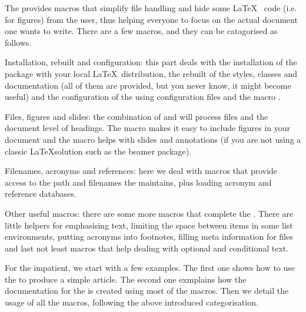 
The  provides macros that simplify file handling and hide some \LaTeX~
code (i.e. for figures) from the user, thus helping everyone to focus on
the actual document one wants to write. There are a few macros, and they
can be catagorised as follows.
\begin{skbnotelist}
  \item Installation, rebuilt and configuration: this part deals with the 
        installation of the package with your local \LaTeX~distribution,
        the rebuilt of the styles, classes and documentation (all of them are
        provided, but you never know, it might become useful) and the configuration
        of the  using configuration files and the macro \cmd{\skbconfig}.
  \item Files, figures and slides: the combination of \cmd{\skbheading} and
        \cmd{\skbinput} will process files and the document level of headings.
        The macro \cmd{\skbfigure} makes it easy to include figures in your document 
        and the macro \cmd{\skbslide} helps with  slides and annotations (if 
        you are not using a classic \LaTeX solution such as the beamer package).
  \item Filenames, acronyms and references: here we deal with macros that provide 
        access to the path and filenames the  maintains, plus loading acronym and 
        reference databases.
  \item Other useful macros: there are some more macros that complete the . There 
        are little helpers for emphasising text, limiting the space between items in some
        list environments, putting acronyms into footnotes, filling meta information for 
         files and last not least macros that help dealing with optional and conditional text.
\end{skbnotelist}

For the impatient, we start with a few examples. The first one shows how to use the  to
produce a simple article. The second one exmplains how the documentation for the  is 
created using most of the  macros. Then we detail the usage of all the macros, following 
the above introduced categorisation.